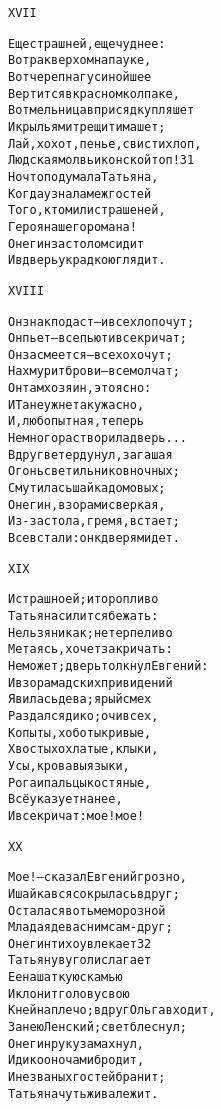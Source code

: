 \begin{minipage}[t]{\dimexpr 0.5\textwidth -\tabcolsep-.5pt}
\begin{alltt}\normalfont\centering
XVII

Еще страшней, еще чуднее:
Вот рак верхом на пауке,
Вот череп на гусиной шее
Вертится в красном колпаке,
Вот мельница вприсядку пляшет
И крыльями трещит и машет;
Лай, хохот, пенье, свист и хлоп,
Людская молвь и конской топ! 31
Но что подумала Татьяна,
Когда узнала меж гостей
Того, кто мил и страшен ей,
Героя нашего романа!
Онегин за столом сидит
И в дверь украдкою глядит.
\end{alltt}
\end{minipage}

\begin{minipage}[t]{\dimexpr 0.5\textwidth -\tabcolsep-.5pt}
\begin{alltt}\normalfont\centering
XVIII

Он знак подаст — и все хлопочут;
Он пьет — все пьют и все кричат;
Он засмеется — все хохочут;
Нахмурит брови — все молчат;
Он там хозяин, это ясно:
И Тане уж не так ужасно,
И, любопытная, теперь
Немного растворила дверь...
Вдруг ветер дунул, загашая
Огонь светильников ночных;
Смутилась шайка домовых;
Онегин, взорами сверкая,
Из-за стола, гремя, встает;
Все встали: он к дверям идет.
\end{alltt}
\end{minipage}
\clearpage

\begin{minipage}[t]{\dimexpr 0.5\textwidth -\tabcolsep-.5pt}
\begin{alltt}\normalfont\centering
XIX

И страшно ей; и торопливо
Татьяна силится бежать:
Нельзя никак; нетерпеливо
Метаясь, хочет закричать:
Не может; дверь толкнул Евгений:
И взорам адских привидений
Явилась дева; ярый смех
Раздался дико; очи всех,
Копыты, хоботы кривые,
Хвосты хохлатые, клыки,
Усы, кровавы языки,
Рога и пальцы костяные,
Всё указует на нее,
И все кричат: мое! мое!
\end{alltt}
\end{minipage}

\begin{minipage}[t]{\dimexpr 0.5\textwidth -\tabcolsep-.5pt}
\begin{alltt}\normalfont\centering
XX

Мое! — сказал Евгений грозно,
И шайка вся сокрылась вдруг;
Осталася во тьме морозной
Младая дева с ним сам-друг;
Онегин тихо увлекает 32
Татьяну в угол и слагает
Ее на шаткую скамью
И клонит голову свою
К ней на плечо; вдруг Ольга входит,
За нею Ленский; свет блеснул;
Онегин руку замахнул,
И дико он очами бродит,
И незваных гостей бранит;
Татьяна чуть жива лежит.
\end{alltt}
\end{minipage}
\clearpage

